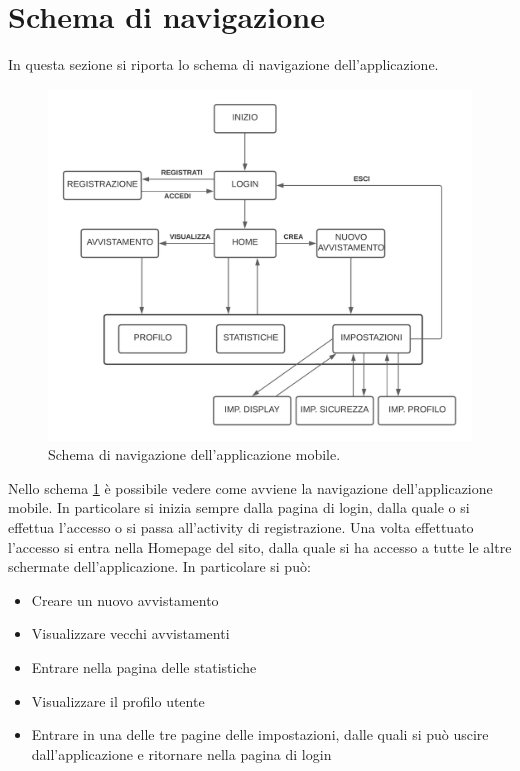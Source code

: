 \documentclass[a4paper,final,12pt]{report}
\begin{document}
\newpage

\section{Schema di navigazione}
In questa sezione si riporta lo schema di navigazione dell'applicazione.
\begin{figure}[hbtp]
\centering
\includegraphics[scale=0.75]{img_concettuale/Schema_Navigation.png}
\caption{Schema di navigazione dell'applicazione mobile.}
\label{figura:navigazione}
\end{figure}
Nello schema \ref{figura:navigazione} è possibile vedere come avviene la navigazione dell'applicazione mobile. In particolare si inizia sempre dalla pagina di login, dalla quale o si effettua l'accesso o si passa all'activity di registrazione. Una volta effettuato l'accesso si entra nella Homepage del sito, dalla quale si ha accesso a tutte le altre schermate dell'applicazione. In particolare si può:
\begin{itemize}
    \item Creare un nuovo avvistamento
    \item Visualizzare vecchi avvistamenti
    \item Entrare nella pagina delle statistiche
    \item Visualizzare il profilo utente
    \item Entrare in una delle tre pagine delle impostazioni, dalle quali si può uscire dall'applicazione e ritornare nella pagina di login
\end{itemize}
\end{document}
